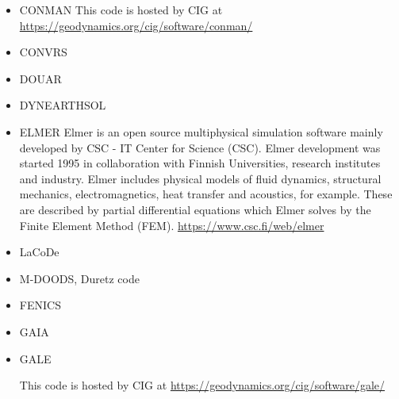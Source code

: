 \begin{itemize}


\item CONMAN
This code is hosted by CIG at \url{https://geodynamics.org/cig/software/conman/}

\cite{kirh90}
\cite{itki94}
\cite{kian95}
\cite{kian98}
\cite{itki98}
\cite{befo99}
\cite{nake07}
\cite{dadh07}
\cite{kifr15}


\item CONVRS 
\cite{yoth12}
\cite{yosh13} 
 



\item DOUAR

\cite{brtf08}
\cite{thfb08}
\cite{yahb09}
\cite{brya10}
\cite{lobh10}
\cite{mutg13}
\cite{whbb14}
\cite{neew18}
\cite{koen19}

\item DYNEARTHSOL
\cite{chtl13}


\item ELMER
Elmer is an open source multiphysical simulation software mainly developed by 
CSC - IT Center for Science (CSC). Elmer development was started 1995 in collaboration with 
Finnish Universities, research institutes and industry. Elmer includes physical models of 
fluid dynamics, structural mechanics, electromagnetics, heat transfer and acoustics, 
for example. These are described by partial differential equations which Elmer solves 
by the Finite Element Method (FEM). \url{https://www.csc.fi/web/elmer}

\cite{mals14}


\item{LaCoDe} 
\cite{demh19}

\item M-DOODS, Duretz code
\cite{yatd12}
\cite{yahb13}
\cite{chmd19}

\item FENICS
\cite{alrk14}


\item GAIA

\cite{hutm13}

\item GALE

This code is hosted by CIG at \url{https://geodynamics.org/cig/software/gale/}

\cite{fabs08}
\cite{gotc08}
\cite{beve10}
\cite{cmwt10}
\cite{lehm12}\cite{liqi12}
\cite{arbi13}


\end{itemize}
